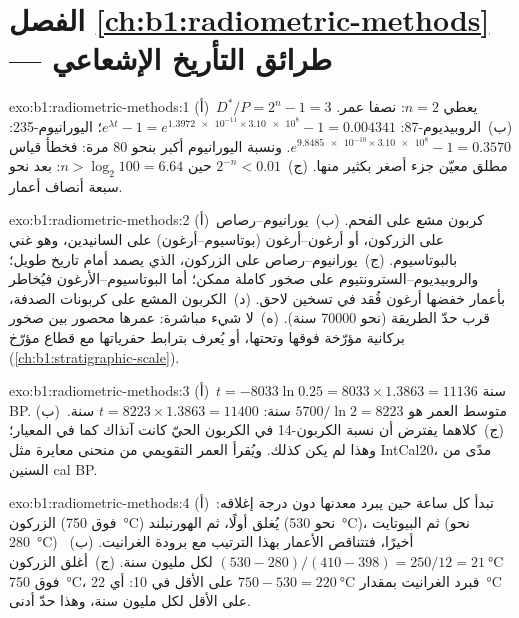 \section*{الفصل \ref{ch:b1:radiometric-methods} --- طرائق التأريخ الإشعاعي}

\begin{solution}{exo:b1:radiometric-methods:1}
(أ)~$D^*/P = 2^n - 1 = 3$ يعطي $n = 2$: نصفا عمر. (ب)~الروبيديوم-87:
$e^{\lambda t} - 1 = e^{\num{1.3972e-11} \times \num{3.10e8}} - 1 = 0.004341$؛
اليورانيوم-235: $e^{\num{9.8485e-10} \times \num{3.10e8}} - 1 = 0.3570$. ونسبة اليورانيوم أكبر بنحو 80 مرة: فخطأ قياس مطلق معيّن جزء أصغر بكثير منها. (ج)~$2^{-n} < 0.01$ حين $n > \log_2 100 = 6.64$: بعد نحو سبعة أنصاف أعمار.
\end{solution}

\begin{solution}{exo:b1:radiometric-methods:2}
(أ)~كربون مشع على الفحم. (ب)~يورانيوم–رصاص على الزركون، أو أرغون–أرغون (بوتاسيوم–أرغون) على السانيدين، وهو  غني بالبوتاسيوم.
(ج)~يورانيوم–رصاص على الزركون، الذي يصمد أمام تاريخ طويل؛ والروبيديوم–السترونتيوم على صخور كاملة ممكن؛ أما البوتاسيوم–الأرغون فيُخاطر بأعمار خفضها أرغون فُقد في تسخين لاحق. (د)~الكربون المشع على كربونات الصدفة، قرب حدّ الطريقة (نحو \num{70000} سنة). (ه)~لا شيء مباشرة: عمرها محصور بين صخور بركانية مؤرّخة فوقها وتحتها، أو يُعرف بترابط حفرياتها مع قطاع مؤرّخ (\cref{ch:b1:stratigraphic-scale}).
\end{solution}

\begin{solution}{exo:b1:radiometric-methods:3}
(أ)~$t = -8033 \ln 0.25 = 8033 \times 1.3863 = \num{11136}$ سنة BP.
(ب)~متوسط العمر هو $5700/\ln 2 = \num{8223}$ سنة: $t = 8223 \times 1.3863 =
\num{11400}$ سنة. (ج)~كلاهما يفترض أن نسبة الكربون-14 في الكربون الحيّ كانت آنذاك كما في المعيار؛ وهذا لم يكن كذلك. ويُقرأ العمر التقويمي من منحنى معايرة مثل IntCal20، مدًى من السنين cal BP.
\end{solution}

\begin{solution}{exo:b1:radiometric-methods:4}
(أ)~تبدأ كل ساعة حين يبرد معدنها دون درجة إغلاقه:
الزركون (فوق \qty{750}{\celsius}) يُغلق أولًا، ثم الهورنبلند (نحو \qty{530}{\celsius})، ثم البيوتايت (نحو \qty{280}{\celsius}) أخيرًا، فتتناقص الأعمار بهذا الترتيب مع برودة الغرانيت. (ب)~$(530 - 280)/(410 - 398) =
250/12 = \qty{21}{\celsius}$ لكل مليون سنة. (ج)~أغلق الزركون فوق
\qty{750}{\celsius}، فبرد الغرانيت بمقدار $750 - 530 =
\qty{220}{\celsius}$ على الأقل في \qty{10}{\Myr}: أي \qty{22}{\celsius} على الأقل لكل مليون سنة، وهذا حدّ أدنى.
\end{solution}

